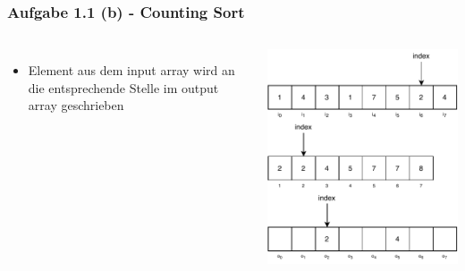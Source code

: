 \documentclass[aspectratio=169]{beamer}
\begin{document}
\begin{frame}
	\frametitle{Aufgabe 1.1 (b) - Counting Sort}
	\begin{columns}[c] %
	
	\begin{itemize}
		\item Element aus dem input array wird an die entsprechende Stelle im output array geschrieben
	\end{itemize}
	
	\includegraphics[scale=.7]{cs13.pdf}
	
	\end{columns}
	\end{frame}
\end{document}
